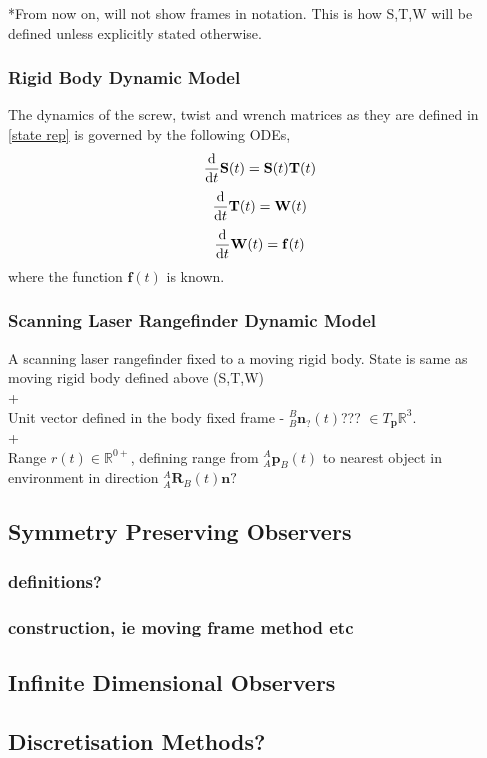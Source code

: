		*From now on, will not show frames in notation. This is how S,T,W will be defined unless explicitly stated otherwise.
						
	\subsubsection{Rigid Body Dynamic Model}
		The dynamics of the screw, twist and wrench matrices as they are defined in \ref{state rep} is governed by the following ODEs,
		\begin{equation}
			{\frac{\textnormal{d}}{\textnormal{d}t}} \mathbf{S}(t) =\mathbf{S}(t)\mathbf{T}(t)
		\end{equation}		
		\begin{equation}
			{\frac{\textnormal{d}}{\textnormal{d}t}} \mathbf{T}(t) = \mathbf{W}(t)
		\end{equation}		
		\begin{equation}
			{\frac{\textnormal{d}}{\textnormal{d}t}} \mathbf{W}(t)=\mathbf{f}(t)			
		\end{equation}
		where the function $\mathbf{f}(t)$ is known.
		
	\subsubsection{Scanning Laser Rangefinder Dynamic Model}
		A scanning laser rangefinder fixed to a moving rigid body. State is same as moving rigid body defined above (S,T,W)\\+\\
		Unit vector defined in the body fixed frame  - ${^{B}_{B}\mathbf{n}^{}_{?}(t)}$??? $\in T_\mathbf{p}\mathbb{R}^3$.\\+\\
		Range $r(t) \in \mathbb{R}^{0+}$, defining range from $^{A}_{A}\mathbf{p}^{}_{B}(t)$ to nearest object in environment in direction $^{A}_{A}\mathbf{R}^{}_{B}(t)\mathbf{n?}$
		

\subsection{Symmetry Preserving Observers}
	\subsubsection{definitions?}
	\subsubsection{construction, ie moving frame method etc}
\subsection{Infinite Dimensional Observers}
\subsection{Discretisation Methods?}